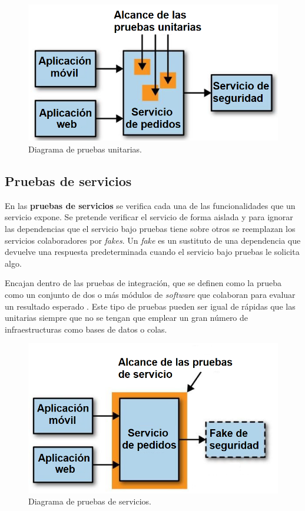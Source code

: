 \documentclass[11pt,spanish,listoffigures]{tfgetsinf}
\begin{document}
\begin{figure}[h]
\centering
\includegraphics[scale=0.5]{Unit_Tests_ES}
\caption{Diagrama de pruebas unitarias.}
\end{figure}

\subsection{Pruebas de servicios}

En las \textbf{pruebas de servicios} se verifica cada una de las funcionalidades que un servicio expone. Se pretende verificar el servicio de forma aislada y para ignorar las dependencias que el servicio bajo pruebas tiene sobre otros se reemplazan los servicios colaboradores por \textit{fakes}. Un \textit{fake} es un sustituto  de una dependencia que devuelve una respuesta predeterminada cuando el servicio bajo pruebas le solicita algo.

Encajan dentro de las pruebas de integración, que se definen como la prueba como un conjunto de dos o más módulos de \textit{software} que colaboran para evaluar un resultado esperado \cite{Osherove2014}. Este tipo de pruebas pueden ser igual de rápidas que las unitarias siempre que no se tengan que emplear un gran número de infraestructuras como bases de datos o colas.

\begin{figure}[h]
\centering
\includegraphics[scale=0.5]{Service_Tests_ES}
\caption{Diagrama de pruebas de servicios.}
\end{figure}
\end{document}
